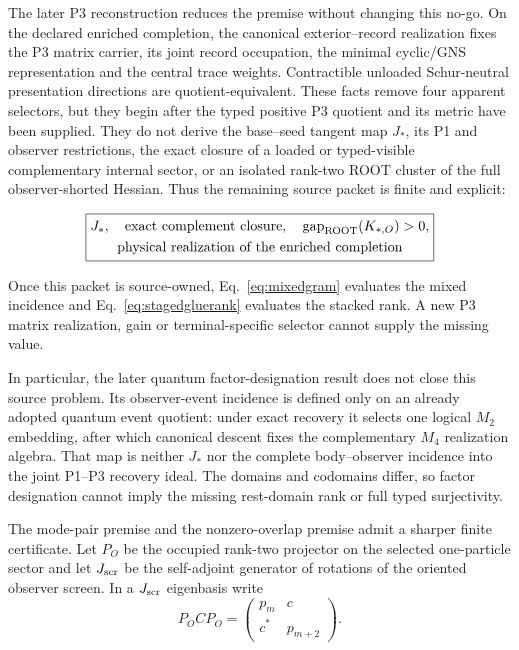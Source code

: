 The later P3 reconstruction reduces the premise without changing this no-go.
On the declared enriched completion, the canonical exterior--record
realization fixes the P3 matrix carrier, its joint record occupation, the
minimal cyclic/GNS representation and the central trace weights. Contractible
unloaded Schur-neutral presentation directions are quotient-equivalent. These
facts remove four apparent selectors, but they begin after the typed positive
P3 quotient and its metric have been supplied. They do not derive the
base--seed tangent map $J_*$, its P1 and observer restrictions, the exact
closure of a loaded or typed-visible complementary internal sector, or an
isolated rank-two ROOT cluster of the full observer-shorted Hessian. Thus the
remaining source packet is finite and explicit:

\begin{equation}
\boxed{
\begin{gathered}
J_*,\quad \text{exact complement closure},\quad
\operatorname{gap}_{\rm ROOT}(K_{*,O})>0,\\
\text{physical realization of the enriched completion}
\end{gathered}}
\label{eq:p3premisereduction}
\end{equation}

Once this packet is source-owned, Eq.~\eqref{eq:mixedgram} evaluates the mixed
incidence and Eq.~\eqref{eq:stagedgluerank} evaluates the stacked rank. A new
P3 matrix realization, gain or terminal-specific selector cannot supply the
missing value.

In particular, the later quantum factor-designation result does not close
this source problem.  Its observer-event incidence is defined only on an
already adopted quantum event quotient: under exact recovery it selects one
logical $M_2$ embedding, after which canonical descent fixes the complementary
$M_4$ realization algebra.  That map is neither $J_*$ nor the complete
body--observer incidence into the joint P1--P3 recovery ideal.  The domains
and codomains differ, so factor designation cannot imply the missing
rest-domain rank or full typed surjectivity.

The mode-pair premise and the nonzero-overlap premise admit a sharper finite
certificate.  Let $P_O$ be the occupied rank-two projector on the selected
one-particle sector and let $J_{\rm scr}$ be the self-adjoint generator of
rotations of the oriented observer screen.  In a $J_{\rm scr}$ eigenbasis
write
\begin{equation}
P_O C P_O=
\begin{pmatrix}p_m&c\\c^*&p_{m+2}\end{pmatrix}.
\label{eq:rootttcluster}
\end{equation}

